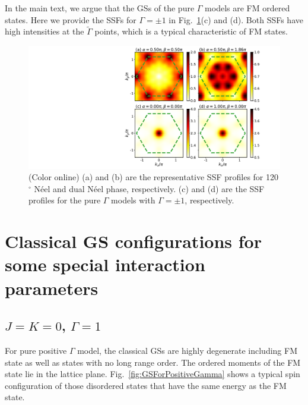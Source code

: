 \documentclass[aps,prb,reprint,amsfonts,amsmath,amssymb,showpacs,groupedaddress,superscriptaddress]{revtex4-1}
\begin{document}
In the main text, we argue that the GSs of the pure $\Gamma$ models are FM ordered states. Here we provide the SSFs for $\Gamma = \pm 1$ in Fig.~\ref{fig:AppendixSSF}(c) and (d). Both SSFs have high intensities at the $\tilde{\Gamma}$ points, which is a typical characteristic of FM states.

\begin{figure}
    \centering
    \includegraphics[width=\columnwidth]{AppendixSSF.pdf}
    \caption{\label{fig:AppendixSSF}(Color online) (a) and (b) are the representative SSF profiles for 120$^\circ$ N\'{e}el and dual N\'{e}el phase, respectively. (c) and (d) are the SSF profiles for the pure $\Gamma$ models with $\Gamma = \pm 1$, respectively.}
\end{figure}

\section{\label{apx:DegeneratedStates}Classical GS configurations for some special interaction parameters}

\subsection{$J=K=0$, $\Gamma=1$}

For pure positive $\Gamma$ model, the classical GSs are highly degenerate including FM state as well as states with no long range order. The ordered moments of the FM state lie in the lattice plane. Fig.~\ref{fig:GSForPositiveGamma} shows a typical spin configuration of those disordered states that have the same energy as the FM state.
\end{document}
